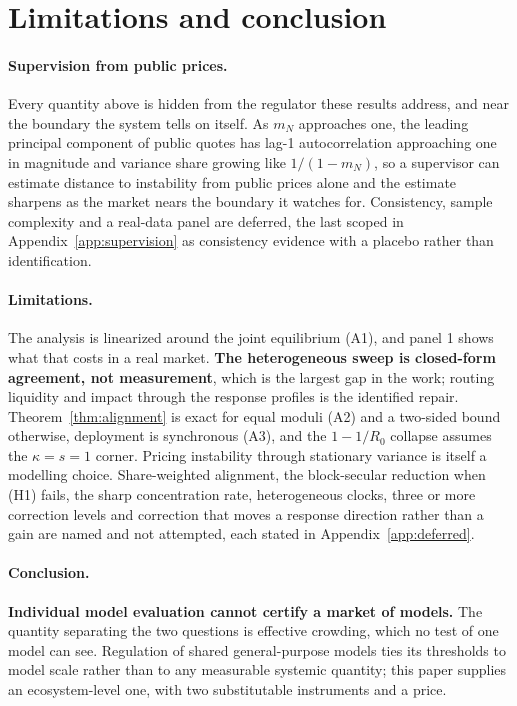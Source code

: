 \documentclass{article}
\theoremstyle{plain}
\theoremstyle{definition}
\newcommand{\mN}{m_N}
\begin{document}
\section{Limitations and conclusion}
\label{sec:limitations}

\paragraph{Supervision from public prices.}
Every quantity above is hidden from the regulator these results address, and near the boundary the system tells on itself. As $\mN$ approaches one, the leading principal component of public quotes has lag-1 autocorrelation approaching one in magnitude and variance share growing like $1/(1-\mN)$, so a supervisor can estimate distance to instability from public prices alone and the estimate sharpens as the market nears the boundary it watches for. Consistency, sample complexity and a real-data panel are deferred, the last scoped in Appendix~\ref{app:supervision} as consistency evidence with a placebo rather than identification.

\paragraph{Limitations.}
The analysis is linearized around the joint equilibrium (A1), and panel 1 shows what that costs in a real market. \textbf{The heterogeneous sweep is closed-form agreement, not measurement}, which is the largest gap in the work; routing liquidity and impact through the response profiles is the identified repair. Theorem~\ref{thm:alignment} is exact for equal moduli (A2) and a two-sided bound otherwise, deployment is synchronous (A3), and the $1-1/R_0$ collapse assumes the $\kappa=s=1$ corner. Pricing instability through stationary variance is itself a modelling choice. Share-weighted alignment, the block-secular reduction when (H1) fails, the sharp concentration rate, heterogeneous clocks, three or more correction levels and correction that moves a response direction rather than a gain are named and not attempted, each stated in Appendix~\ref{app:deferred}.

\paragraph{Conclusion.}
\textbf{Individual model evaluation cannot certify a market of models.} The quantity separating the two questions is effective crowding, which no test of one model can see. Regulation of shared general-purpose models ties its thresholds to model scale rather than to any measurable systemic quantity; this paper supplies an ecosystem-level one, with two substitutable instruments and a price.
\end{document}

